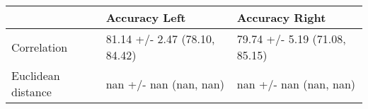 \begin{tabular}{lll}
\toprule
{} &                  Accuracy Left &                 Accuracy Right \\
\midrule
Correlation        &  81.14 +/- 2.47 (78.10, 84.42) &  79.74 +/- 5.19 (71.08, 85.15) \\
Euclidean distance &         nan +/- nan (nan, nan) &         nan +/- nan (nan, nan) \\
\bottomrule
\end{tabular}

